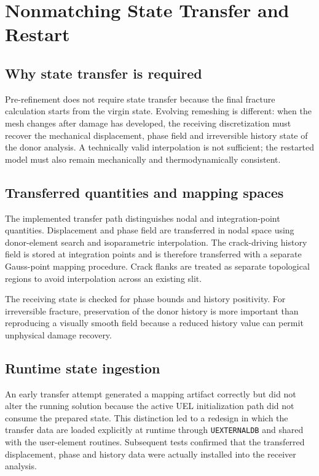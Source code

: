 \chapter{Nonmatching State Transfer and Restart}
\label{ch:transfer}

\section{Why state transfer is required}
Pre-refinement does not require state transfer because the final fracture calculation starts from the virgin state. Evolving remeshing is different: when the mesh changes after damage has developed, the receiving discretization must recover the mechanical displacement, phase field and irreversible history state of the donor analysis. A technically valid interpolation is not sufficient; the restarted model must also remain mechanically and thermodynamically consistent.

\section{Transferred quantities and mapping spaces}
The implemented transfer path distinguishes nodal and integration-point quantities. Displacement and phase field are transferred in nodal space using donor-element search and isoparametric interpolation. The crack-driving history field is stored at integration points and is therefore transferred with a separate Gauss-point mapping procedure. Crack flanks are treated as separate topological regions to avoid interpolation across an existing slit.

The receiving state is checked for phase bounds and history positivity. For irreversible fracture, preservation of the donor history is more important than reproducing a visually smooth field because a reduced history value can permit unphysical damage recovery.

\section{Runtime state ingestion}
An early transfer attempt generated a mapping artifact correctly but did not alter the running solution because the active UEL initialization path did not consume the prepared state. This distinction led to a redesign in which the transfer data are loaded explicitly at runtime through \texttt{UEXTERNALDB} and shared with the user-element routines. Subsequent tests confirmed that the transferred displacement, phase and history data were actually installed into the receiver analysis.

